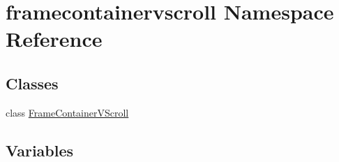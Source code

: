 \hypertarget{namespaceframecontainervscroll}{}\section{framecontainervscroll Namespace Reference}
\label{namespaceframecontainervscroll}
\subsection*{Classes}
\begin{DoxyCompactItemize}
\item 
class \hyperlink{classframecontainervscroll_1_1FrameContainerVScroll}{Frame\+Container\+V\+Scroll}
\end{DoxyCompactItemize}
\subsection*{Variables}
